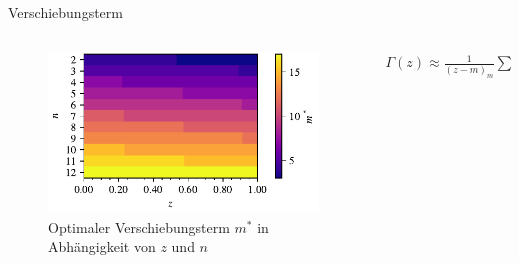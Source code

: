 \begin{frame}{Verschiebungsterm}
\begin{columns}
\begin{column}{0.625\textwidth}
\begin{figure}[h]
\centering
\includegraphics[width=1\textwidth]{../images/targets.pdf}
\caption{Optimaler Verschiebungsterm $m^*$ in Abhängigkeit von $z$ und $n$}
\end{figure}
\end{column}
\begin{column}{0.375\textwidth}
\begin{align*}
\Gamma(z)
\approx
\frac{1}{(z-m)_{m}} \sum_{i=1}^{n} x_i^{z + m - 1} A_i
\end{align*}
\end{column}
\end{columns}
\end{frame}

